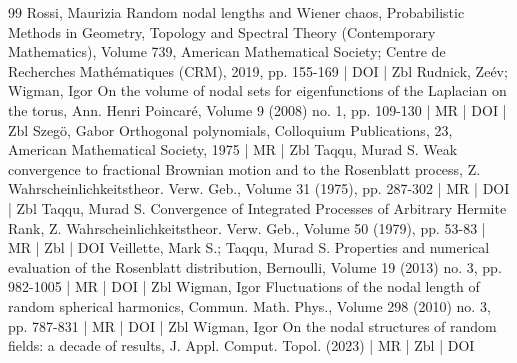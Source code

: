 \documentclass[10pt]{amsart}
\theoremstyle{definition}\newtheorem{defi}[theo]{Definition}\newtheorem{rema}[theo]{Remark}\newtheorem{exam}[theo]{Example}\newtheorem{exem}[theo]{Example}\newtheorem{nota}[theo]{Notation}
\begin{document}
\begin{thebibliography}{99}
 Rossi, Maurizia Random nodal lengths and Wiener chaos, Probabilistic Methods in Geometry, Topology and Spectral Theory (Contemporary Mathematics), Volume 739, American Mathematical Society; Centre de Recherches Mathématiques (CRM), 2019, pp. 155-169 | DOI | Zbl
 Rudnick, Zeév; Wigman, Igor On the volume of nodal sets for eigenfunctions of the Laplacian on the torus, Ann. Henri Poincaré, Volume 9 (2008) no. 1, pp. 109-130 | MR | DOI | Zbl
 Szegö, Gabor Orthogonal polynomials, Colloquium Publications, 23, American Mathematical Society, 1975 | MR | Zbl
 Taqqu, Murad S. Weak convergence to fractional Brownian motion and to the Rosenblatt process, Z. Wahrscheinlichkeitstheor. Verw. Geb., Volume 31 (1975), pp. 287-302 | MR | DOI | Zbl
 Taqqu, Murad S. Convergence of Integrated Processes of Arbitrary Hermite Rank, Z. Wahrscheinlichkeitstheor. Verw. Geb., Volume 50 (1979), pp. 53-83 | MR | Zbl | DOI
 Veillette, Mark S.; Taqqu, Murad S. Properties and numerical evaluation of the Rosenblatt distribution, Bernoulli, Volume 19 (2013) no. 3, pp. 982-1005 | MR | DOI | Zbl
 Wigman, Igor Fluctuations of the nodal length of random spherical harmonics, Commun. Math. Phys., Volume 298 (2010) no. 3, pp. 787-831 | MR | DOI | Zbl
 Wigman, Igor On the nodal structures of random fields: a decade of results, J. Appl. Comput. Topol. (2023) | MR | Zbl | DOI
\end{thebibliography}
\end{document}
